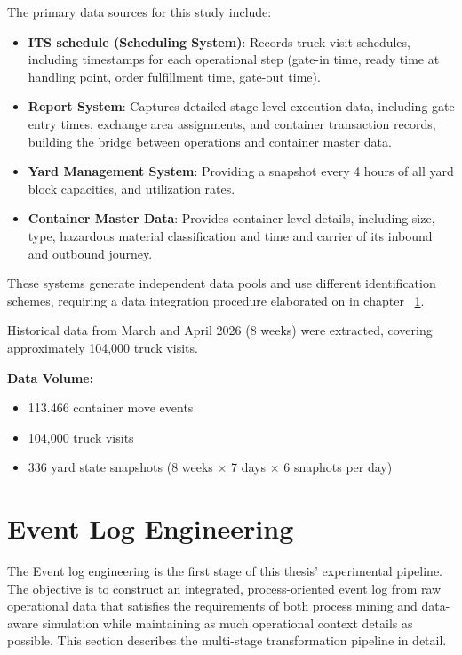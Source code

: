     The primary data sources for this study include:
    
    \begin{itemize}
        \item \textbf{ITS schedule (Scheduling System)}: Records truck visit schedules, including timestamps for each operational step (gate-in time, ready time at handling point, order fulfillment time, gate-out time).
        \item \textbf{Report System}: Captures detailed stage-level execution data, including gate entry times, exchange area assignments, and container transaction records, building the bridge between operations and container master data. 
        \item \textbf{Yard Management System}: Providing a snapshot every 4 hours of all yard block capacities, and utilization rates.
        \item \textbf{Container Master Data}: Provides container-level details, including size, type, hazardous material classification and time and carrier of its inbound and outbound journey. 
    \end{itemize}
    
    These systems generate independent data pools and use different identification schemes, requiring a data integration procedure elaborated on in chapter ~\ref{Event Log Engineering}.
    
    Historical data from March and April 2026 (8 weeks) were extracted, covering approximately 104,000 truck visits.
    
    \textbf{Data Volume:}
    \begin{itemize}
        \item 113.466 container move events
        \item 104,000 truck visits
        \item 336 yard state snapshots (8 weeks × 7 days × 6 snaphots per day)
    \end{itemize}

\section{Event Log Engineering} \label{Event Log Engineering}


    The Event log engineering is the first stage of this thesis'  experimental pipeline. The objective is to construct an integrated, process-oriented event log from raw operational data that satisfies the requirements of both process mining and data-aware simulation while maintaining as much operational context details as possible. This section describes the multi-stage transformation pipeline in detail.


